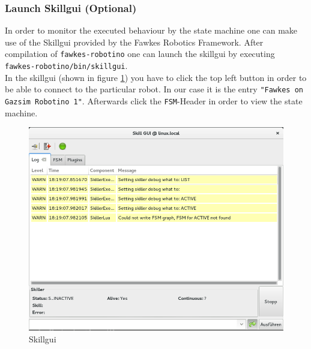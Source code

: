 \documentclass[oribibl]{llncs}
\begin{document}
\subsubsection{Launch Skillgui (Optional)}
In order to monitor the executed behaviour by the state machine one can make use of the Skillgui provided by the Fawkes Robotics Framework.
After compilation of \texttt{fawkes-robotino} one can launch the skillgui by executing \texttt{fawkes-robotino/bin/skillgui}.\\
In the skillgui (shown in figure \ref{skillgui}) you have to click the top left button in order to be able to connect to the particular robot. In our case it is the entry \texttt{"Fawkes on Gazsim Robotino 1"}. Afterwards click the \texttt{FSM}-Header in order to view the state machine.
\begin{figure}
        \centering
        \includegraphics[width=\textwidth]{images/skillgui.png}
        \caption{Skillgui}
        \label{skillgui}
\end{figure}
\end{document}
